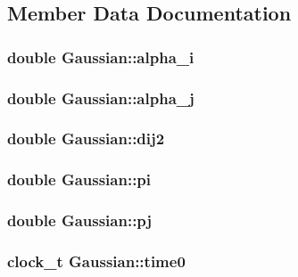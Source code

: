\subsection{Member Data Documentation}
\hypertarget{classGaussian_a5c0b5c62fa9740e7837795e37550fa0e}{
\subsubsection[{alpha\_\-i}]{\setlength{\rightskip}{0pt plus 5cm}double {\bf Gaussian::alpha\_\-i}}}
\label{classGaussian_a5c0b5c62fa9740e7837795e37550fa0e}
\hypertarget{classGaussian_a0ade4a35fe0d7b6a6c41943c06444b46}{
\subsubsection[{alpha\_\-j}]{\setlength{\rightskip}{0pt plus 5cm}double {\bf Gaussian::alpha\_\-j}}}
\label{classGaussian_a0ade4a35fe0d7b6a6c41943c06444b46}
\hypertarget{classGaussian_a4219b30f577fb9ee8c8165ea6d093225}{
\subsubsection[{dij2}]{\setlength{\rightskip}{0pt plus 5cm}double {\bf Gaussian::dij2}}}
\label{classGaussian_a4219b30f577fb9ee8c8165ea6d093225}
\hypertarget{classGaussian_a0296cbcbe7324c6658bd93430a12b40a}{
\subsubsection[{pi}]{\setlength{\rightskip}{0pt plus 5cm}double {\bf Gaussian::pi}}}
\label{classGaussian_a0296cbcbe7324c6658bd93430a12b40a}
\hypertarget{classGaussian_a61907a387874c912ca3460e0d53557d0}{
\subsubsection[{pj}]{\setlength{\rightskip}{0pt plus 5cm}double {\bf Gaussian::pj}}}
\label{classGaussian_a61907a387874c912ca3460e0d53557d0}
\hypertarget{classGaussian_a32d5fa91e8452f5d333b8cd7f4e588f6}{
\subsubsection[{time0}]{\setlength{\rightskip}{0pt plus 5cm}clock\_\-t {\bf Gaussian::time0}}}
